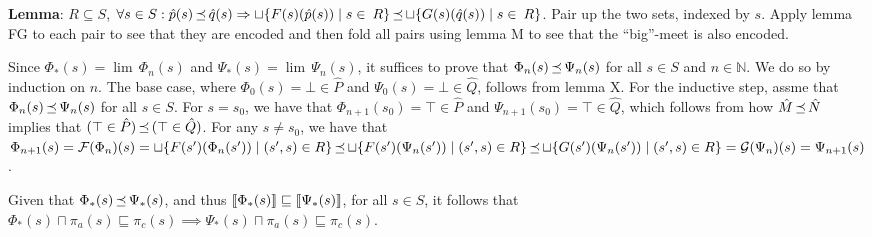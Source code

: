 \textbf{Lemma}: $R \subseteq S$, $\forall s \in S : \hat p(s) \operatorname{\mathrel{\preceq}} \hat q(s) \Rightarrow \sqcup \{ F(s)(\hat p(s)) \mid s \in \: R \} \operatorname{\mathrel{\preceq}} \sqcup \{ G(s)(\hat q(s)) \mid s \in \: R \}$. Pair up the two sets, indexed by $s$. Apply lemma FG to each pair to see that they are encoded and then fold all pairs using lemma M to see that the ``big''-meet is also encoded.

Since $\Phi_{*}(s) = \lim \, \Phi_{n}(s)$ and $\Psi_{*}(s) = \lim \, \Psi_{n}(s)$, it suffices to prove that $\Phi_{n}(s) \operatorname{\mathrel{\preceq}} \Psi_{n}(s)$ for all $s \in S$ and $n \in \mathbb{N}$. We do so by induction on $n$. The base case, where $\Phi_{0}(s) = \bot \in \hat P$ and $\Psi_{0}(s) = \bot \in \hat Q$, follows from lemma X. For the inductive step, assme that $\Phi_{n}(s) \operatorname{\mathrel{\preceq}} \Psi_{n}(s)$ for all $s \in S$. For $s = s_{0}$, we have that $\Phi_{n+1}(s_{0}) = \top \in \hat P$ and $\Psi_{n+1}(s_{0}) = \top \in \hat Q$, which follows from how $\hat M \operatorname{\mathrel{\preceq}} \hat N$ implies that $(\top \in \hat P) \operatorname{\mathrel{\preceq}} \, (\top \in \hat Q)$. For any $s \neq s_{0}$, we have that $\Phi_{n+1}(s) = \mathcal{F}(\Phi_{n})(s) = \sqcup \{ F(s')(\Phi_{n}(s')) \mid (s',s) \in R \} \operatorname{\mathrel{\preceq}} \sqcup \{ F(s')(\Psi_{n}(s')) \mid (s',s) \in R \} \operatorname{\mathrel{\preceq}} \sqcup \{ G(s')(\Psi_{n}(s')) \mid (s',s) \in R \} = \mathcal{G}(\Psi_{n})(s) = \Psi_{n+1}(s)$.

Given that $\Phi_{*}(s) \operatorname{\mathrel{\preceq}} \Psi_{*}(s)$, and thus $\llbracket\Phi_{*}(s)\rrbracket \sqsubseteq \llbracket\Psi_{*}(s)\rrbracket$, for all $s \in S$, it follows that $\Phi_{*}(s) \sqcap \pi_{a}(s) \sqsubseteq \pi_{c}(s) \implies \Psi_{*}(s) \sqcap \pi_{a}(s) \sqsubseteq \pi_{c}(s)$.

